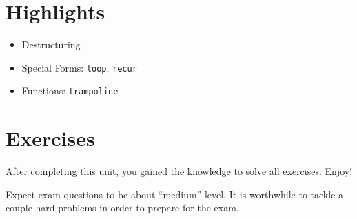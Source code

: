 \documentclass[11pt,a4paper]{article}
\begin{document}
\section{Highlights}

\begin{itemize}
    \item Destructuring
    \item Special Forms: \verb|loop|, \verb|recur|
    \item Functions: \verb|trampoline|
\end{itemize}



\section{Exercises}

\begin{exercise}
    After completing this unit, you gained the knowledge to solve all exercises. Enjoy!

    Expect exam questions to be about ``medium'' level.
    It is worthwhile to tackle a couple hard problems 
    in order to prepare for the exam.
\end{exercise}
\end{document}
